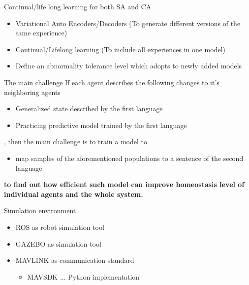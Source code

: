 \documentclass[unknownkeysallowed]{beamer}
\begin{document}
	\begin{frame}{Continual/life long learning for both SA and CA}
		\begin{itemize}
			\item Variational Auto Encoders/Decoders (To generate different versions of the same experience)
			\item Continual/Lifelong learning (To include all experiences in one model)
			\item Define an abnormality tolerance level which adopts to newly added models
		\end{itemize}
	\end{frame}

	\begin{frame}{The main challenge}
		If each agent describes the following changes to it's neighboring agents
		\begin{itemize}
			\item  Generalized state described by the first language
			\item  Practicing predictive model trained by the first language
		\end{itemize}
		, then the main challenge is to train a model to
		\begin{itemize}
			\item map samples of the aforementioned populations to a sentence of the  second language 
		\end{itemize}
		\textbf{to find out how efficient such model can improve homeostasis level of individual agents and the whole system.}
	\end{frame}

	\begin{frame}{Simulation environment}
		\begin{itemize}
			\item ROS as robot simulation tool
			\item GAZEBO as simulation tool
			\item MAVLINK as communication standard
				\begin{itemize}
					\item MAVSDK ... Python implementation
				\end{itemize}
		\end{itemize}
	\end{frame}
\end{document}
